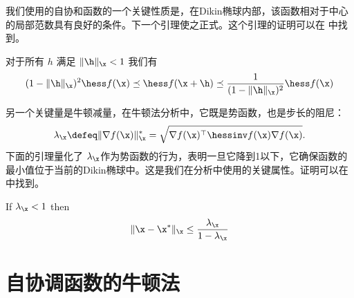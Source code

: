 我们使用的自协和函数的一个关键性质是，在Dikin椭球内部，该函数相对于中心的局部范数具有良好的条件。下一个引理使之正式。这个引理的证明可以在 \cite{NemirovskiBook}中找到。
\begin{lemma}  
对于所有 $h$ 满足
$\|\h\|_{\x} < 1$
我们有
\[ (1 - \|\h\|_{\x})^2 \hess f(\x) \preceq \hess
f(\x + \h) \preceq \frac{1}{(1 - \|\h\|_{\x})^2}\hess f(\x)\]
\end{lemma}

另一个关键量是牛顿减量，在牛顿法分析中，它既是势函数，也是步长的阻尼：
$$\lambda_\x \defeq \|\nabla f(\x)\|_{\x}^{*} =
\sqrt{\nabla f(\x)^{\top} \hessinv f(\x) \nabla f(\x)} .$$ 
下面的引理量化了 $\lambda_\x$作为势函数的行为，表明一旦它降到1以下，它确保函数的最小值位于当前的Dikin椭球中。这是我们在分析中使用的关键属性。证明可以在\cite{NemirovskiBook}中找到。
\begin{lemma} 
\label{lemma:lambdalemma}
If $\lambda_\x < 1$ then 
\[ \|\x - \x^*\|_{\x}  \leq \frac{\lambda_\x}{1 - \lambda_\x}\]
\end{lemma}




\section{
    自协调函数的牛顿法
    }

